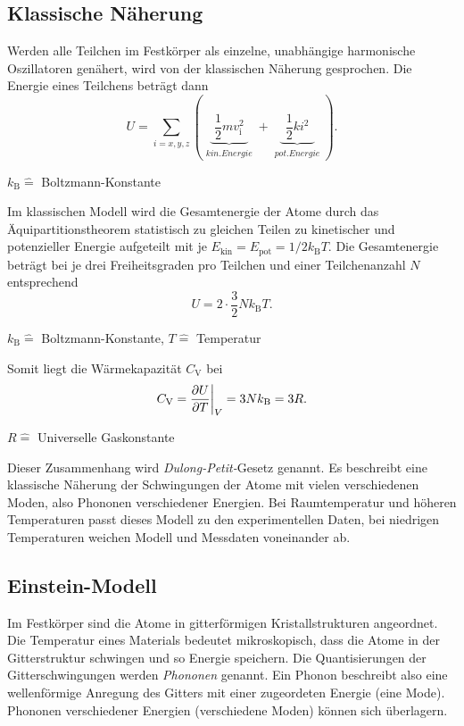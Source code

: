 \subsection{Klassische Näherung}
Werden alle Teilchen im Festkörper als einzelne, unabhängige harmonische Oszillatoren genähert, wird von der klassischen Näherung gesprochen.
Die Energie eines Teilchens beträgt dann
\begin{equation*}
	U = \sum_{i=x,y,z} \left( \underbrace{ \,\, \frac{1}{2}mv_{\text{i}}^2 \,\, }_{\substack{kin. Energie}} + \underbrace{ \,\, \frac{1}{2} k i^2 \,\, }_{\substack{pot. Energie}} \right).
\end{equation*}
\begin{center}
	\tiny{$k_{\text{B}} \widehat{=}$ Boltzmann-Konstante }
\end{center}
Im klassischen Modell wird die Gesamtenergie der Atome durch das Äquipartitionstheorem statistisch zu gleichen Teilen zu kinetischer und potenzieller Energie aufgeteilt mit je $E_{\text{kin}} = E_{\text{pot}} = 1/2 k_{\text{B}} T $.
Die Gesamtenergie beträgt bei je drei Freiheitsgraden pro Teilchen und einer Teilchenanzahl $N$ entsprechend
\begin{equation*}
	U = 2 \cdot \frac{3}{2} N k_{\text{B}} T.
\end{equation*}
\begin{center}
	\tiny{$k_{\text{B}} \widehat{=}$ Boltzmann-Konstante, $T \widehat{=}$ Temperatur}
\end{center}
Somit liegt die Wärmekapazität $C_{\text{V}}$ bei
\begin{equation*}
	C_{\text{V}} = \frac{\partial U}{\partial T} \bigg{\vert}_{V} = 3 N k_{\text{B}} = 3 R.
\end{equation*}
\begin{center}
	\tiny{$R \widehat{=}$ Universelle Gaskonstante}
\end{center}
Dieser Zusammenhang wird \textit{Dulong-Petit-}Gesetz genannt.
Es beschreibt eine klassische Näherung der Schwingungen der Atome mit vielen verschiedenen Moden, also Phononen verschiedener Energien.
Bei Raumtemperatur und höheren Temperaturen passt dieses Modell zu den experimentellen Daten, bei niedrigen Temperaturen weichen Modell und Messdaten voneinander ab.

\FloatBarrier
\subsection{Einstein-Modell}
Im Festkörper sind die Atome in gitterförmigen Kristallstrukturen angeordnet.
Die Temperatur eines Materials bedeutet mikroskopisch, dass die Atome in der Gitterstruktur schwingen und so Energie speichern.
Die Quantisierungen der Gitterschwingungen werden \textit{Phononen} genannt.
Ein Phonon beschreibt also eine wellenförmige Anregung des Gitters mit einer zugeordeten Energie (eine Mode).
Phononen verschiedener Energien (verschiedene Moden) können sich überlagern.

